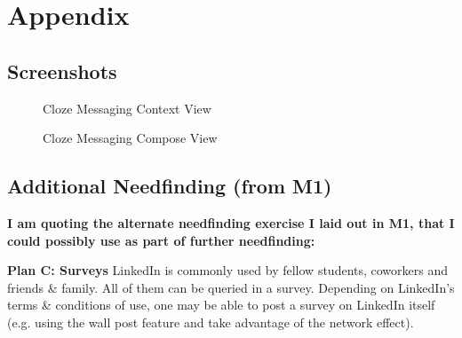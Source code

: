 \documentclass[
	letterpaper, %
]{jdf}
\begin{document}
\printbibliography[heading=none]

\section{Appendix}
\subsection{Screenshots}

\begin{figure}[h]
	\centering
	\caption{Cloze Messaging Context View}
	\label{fig:cloze1}
\end{figure}

\begin{figure}[h]
	\centering
	\caption{Cloze Messaging Compose View}
	\label{fig:cloze2}
\end{figure}


\subsection{Additional Needfinding (from M1)}
\textbf{I am quoting the alternate needfinding exercise I laid out in M1, that I could possibly use as part of further needfinding:}

\textbf{Plan C: Surveys}
LinkedIn is commonly used by fellow students, coworkers and friends \& family. All of them can be queried in a survey. Depending on LinkedIn's terms \& conditions of use, one may be able to post a survey on LinkedIn itself (e.g. using the wall post feature and take advantage of the network effect).
\end{document}
